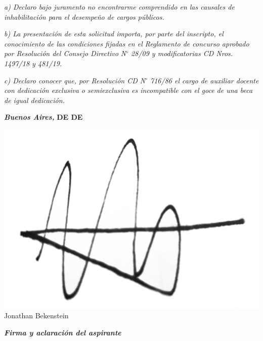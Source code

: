\documentclass{article}
\newcommand{\fecha}[3]{\MakeUppercase{\textbf{#1 de #2 de #3}}}
\begin{document}
\bigskip
\bigskip

\noindent \textit{a) Declaro bajo juramento no encontrarme comprendido en las causales
de inhabilitación para el desempeño de cargos públicos.}

\noindent \textit{b) La presentación de esta solicitud importa, por parte del inscripto,
el conocimiento de las condiciones fijadas en el Reglamento de concurso aprobado
por Resolución del Consejo Directivo N$^\circ$ 28/09 y modificatorias CD Nros. 1497/18 y 481/19.}

\noindent \textit{c) Declaro conocer que, por Resolución CD N$^\circ$ 716/86 el cargo de
auxiliar docente con dedicación exclusiva o semiexclusiva es incompatible con
el goce de una beca de igual dedicación.}

\bigskip
\bigskip

\noindent \textit{\textbf{Buenos Aires,}} \fecha{\numeroDiaEntregaDeDocumentacion}{\nombreMesEntregaDeDocumentacion}{\anioEntregaDeDocumentacion}

\bigskip
\bigskip
\bigskip
\includegraphics[scale=0.04]{firma.png}
\\
Jonathan Bekenstein

\noindent \hdashrule{6cm}{0.5pt}{0.75pt}

\noindent \textit{\textbf{Firma y aclaración del aspirante}}

\newpage


\bigskip
\bigskip
\end{document}

